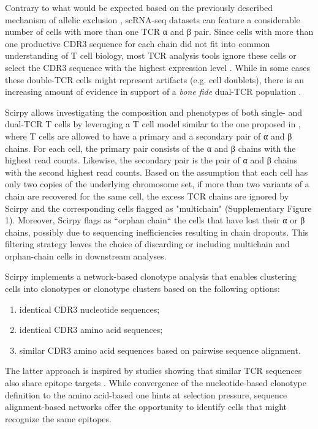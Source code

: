 \documentclass{article}
\begin{document}
Contrary to what would be expected based on the previously described mechanism of allelic exclusion \cite{Brady2010-gh}, scRNA-seq datasets can feature a considerable number of cells with more than one TCR α and β pair. Since cells with more than one productive CDR3 sequence for each chain did not fit into common understanding of T cell biology, most TCR analysis tools ignore these cells \cite{Fischer_undated-cx, Zhang2018-ip} or select the CDR3 sequence with the highest expression level \cite{Afik2017-sg}. While in some cases these double-TCR cells might represent artifacts (e.g. cell doublets), there is an increasing amount of evidence in support of a \textit{bone fide} dual-TCR population \cite{Schuldt2019-ey, Ji2010-bn}. \par

Scirpy allows investigating the composition and phenotypes of both single- and dual-TCR T cells by leveraging a T cell model similar to the one proposed in \cite{Stubbington2016-kh}, where T cells are allowed to have a primary and a secondary pair of α and β chains. For each cell, the primary pair consists of the α and β chains with the highest read counts. Likewise, the secondary pair is the pair of α and β chains with the second highest read counts. Based on the assumption that each cell has only two copies of the underlying chromosome set, if more than two variants of a chain are recovered for the same cell, the excess TCR chains are ignored by Scirpy and the corresponding cells flagged as "multichain" (Supplementary Figure 1).  Moreover, Scirpy flags as “orphan chain“ the cells that have lost their α or β chains, possibly due to sequencing inefficiencies resulting in chain dropouts. This filtering strategy leaves the choice of discarding or including multichain and orphan-chain cells in downstream analyses.\par

Scirpy implements a network-based clonotype analysis that enables clustering cells into clonotypes or clonotype clusters based on the following options:
\begin{enumerate}[label=(\alph*)]
    \item identical CDR3 nucleotide sequences;
    \item identical CDR3 amino acid sequences;
    \item similar CDR3 amino acid sequences based on pairwise sequence alignment. 
\end{enumerate}

The latter approach is inspired by studies showing that similar TCR sequences also share epitope targets \cite{Glanville2017-ay, Dash2017-xt, Fischer_undated-cx}. While convergence of the nucleotide-based clonotype definition to the amino acid-based one hints at selection pressure, sequence alignment-based networks offer the opportunity to identify cells that might recognize the same epitopes.\par

\newpage

\printbibliography[title={Supplementary References}]
\end{document}
